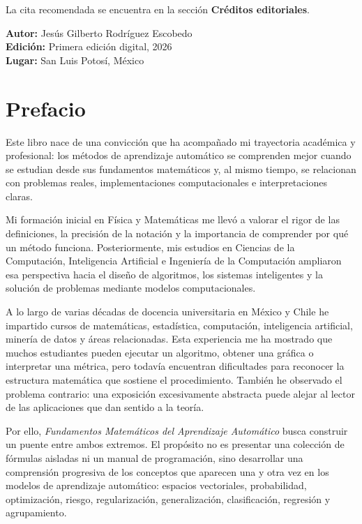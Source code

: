 \documentclass[
  spanish,
  10.5pt,
  letterpaper,
  DIV=11,
  numbers=noendperiod,
  oneside,
  open=any]{scrreprt}
\theoremstyle{definition}
\theoremstyle{definition}
\theoremstyle{plain}
\theoremstyle{remark}
\begin{document}
La cita recomendada se encuentra en la sección \textbf{Créditos
editoriales}.

\textbf{Autor:} Jesús Gilberto Rodríguez Escobedo\\
\textbf{Edición:} Primera edición digital, 2026\\
\textbf{Lugar:} San Luis Potosí, México


\chapter*{Prefacio}\label{prefacio}


Este libro nace de una convicción que ha acompañado mi trayectoria
académica y profesional: los métodos de aprendizaje automático se
comprenden mejor cuando se estudian desde sus fundamentos matemáticos y,
al mismo tiempo, se relacionan con problemas reales, implementaciones
computacionales e interpretaciones claras.

Mi formación inicial en Física y Matemáticas me llevó a valorar el rigor
de las definiciones, la precisión de la notación y la importancia de
comprender por qué un método funciona. Posteriormente, mis estudios en
Ciencias de la Computación, Inteligencia Artificial e Ingeniería de la
Computación ampliaron esa perspectiva hacia el diseño de algoritmos, los
sistemas inteligentes y la solución de problemas mediante modelos
computacionales.

A lo largo de varias décadas de docencia universitaria en México y Chile
he impartido cursos de matemáticas, estadística, computación,
inteligencia artificial, minería de datos y áreas relacionadas. Esta
experiencia me ha mostrado que muchos estudiantes pueden ejecutar un
algoritmo, obtener una gráfica o interpretar una métrica, pero todavía
encuentran dificultades para reconocer la estructura matemática que
sostiene el procedimiento. También he observado el problema contrario:
una exposición excesivamente abstracta puede alejar al lector de las
aplicaciones que dan sentido a la teoría.

Por ello, \emph{Fundamentos Matemáticos del Aprendizaje Automático}
busca construir un puente entre ambos extremos. El propósito no es
presentar una colección de fórmulas aisladas ni un manual de
programación, sino desarrollar una comprensión progresiva de los
conceptos que aparecen una y otra vez en los modelos de aprendizaje
automático: espacios vectoriales, probabilidad, optimización, riesgo,
regularización, generalización, clasificación, regresión y agrupamiento.
\end{document}
